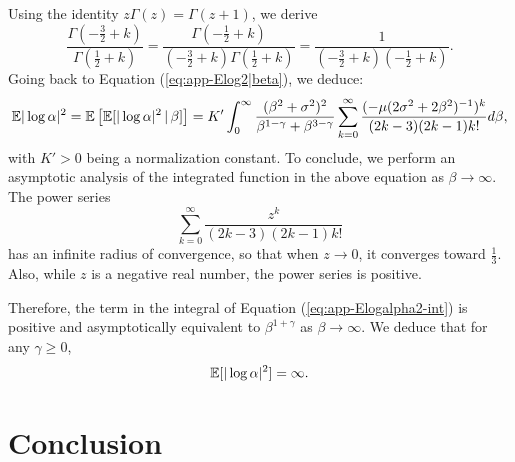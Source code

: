 Using the identity $z\Gamma(z)=\Gamma(z+1)$, we derive 
    \begin{equation}
        \frac{\Gamma(-\frac{3}{2}+k)}{\Gamma(\frac{1}{2}+k)} = \frac{\Gamma(-\frac{1}{2}+k)}{(-\frac{3}{2}+k)\Gamma(\frac{1}{2}+k)}= \frac{1}{(-\frac{3}{2}+k)(-\frac{1}{2}+k)}.
    \end{equation}
Going back to Equation (\ref{eq:app-Elog2|beta}), we deduce:
    \begin{equation}\label{eq:app-Elogalpha2-int}
        \mathbb{E}|\log\alpha|^2 = \mathbb{E}\left[\mathbb{E}[|\log\alpha|^2\,|\,\beta]\right] = K'\int_0^\infty \frac{(\beta^2+\sigma^2)^2}{\beta^{1-\gamma}+\beta^{3-\gamma}}
        \sum_{k=0}^\infty \frac{(-\mu(2\sigma^2+2\beta^2)^{-1})^k}{(2k-3)(2k-1)k!} d\beta,
    \end{equation}
with $K'>0$ being a normalization constant.
To conclude, we perform an asymptotic analysis of the integrated function in the above equation as $\beta\to\infty$.
The power series 
    \begin{equation}
        \sum_{k=0}^\infty \frac{z^k}{(2k-3)(2k-1)k!} %
    \end{equation}
has an infinite radius of convergence, so that when $z\to0$, it converges toward $\frac{1}{3}$. %
Also, while $z$ is a negative real number, the power series is positive.

Therefore, the term in the integral of Equation (\ref{eq:app-Elogalpha2-int}) is positive and asymptotically equivalent to $\beta^{1+\gamma}$ as $\beta\to\infty$. We deduce that for any $\gamma\geq0$,
    \begin{equation}
        \mathbb{E}[|\log\alpha|^2]=\infty.
    \end{equation}
    





\section{Conclusion}














